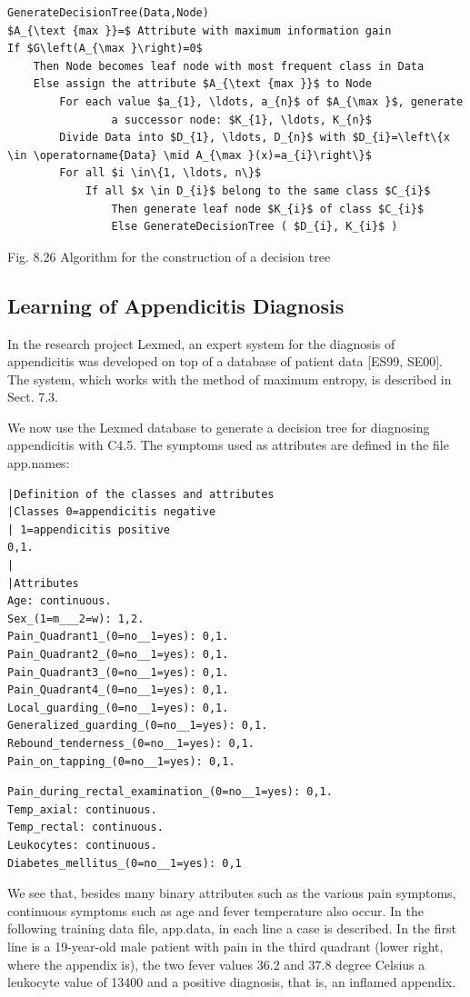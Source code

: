 \documentclass[10pt]{book}
\begin{document}
\begin{verbatim}
GenerateDecisionTree(Data,Node)
$A_{\text {max }}=$ Attribute with maximum information gain
If $G\left(A_{\max }\right)=0$
    Then Node becomes leaf node with most frequent class in Data
    Else assign the attribute $A_{\text {max }}$ to Node
        For each value $a_{1}, \ldots, a_{n}$ of $A_{\max }$, generate
                a successor node: $K_{1}, \ldots, K_{n}$
        Divide Data into $D_{1}, \ldots, D_{n}$ with $D_{i}=\left\{x \in \operatorname{Data} \mid A_{\max }(x)=a_{i}\right\}$
        For all $i \in\{1, \ldots, n\}$
            If all $x \in D_{i}$ belong to the same class $C_{i}$
                Then generate leaf node $K_{i}$ of class $C_{i}$
                Else GenerateDecisionTree ( $D_{i}, K_{i}$ )
\end{verbatim}

Fig. 8.26 Algorithm for the construction of a decision tree

\subsection{Learning of Appendicitis Diagnosis}
In the research project Lexmed, an expert system for the diagnosis of appendicitis was developed on top of a database of patient data [ES99, SE00]. The system, which works with the method of maximum entropy, is described in Sect. 7.3.

We now use the Lexmed database to generate a decision tree for diagnosing appendicitis with C4.5. The symptoms used as attributes are defined in the file app.names:

\begin{verbatim}
|Definition of the classes and attributes
|Classes 0=appendicitis negative
| 1=appendicitis positive
0,1.
|
|Attributes
Age: continuous.
Sex_(1=m___2=w): 1,2.
Pain_Quadrant1_(0=no__1=yes): 0,1.
Pain_Quadrant2_(0=no__1=yes): 0,1.
Pain_Quadrant3_(0=no__1=yes): 0,1.
Pain_Quadrant4_(0=no__1=yes): 0,1.
Local_guarding_(0=no__1=yes): 0,1.
Generalized_guarding_(0=no__1=yes): 0,1.
Rebound_tenderness_(0=no__1=yes): 0,1.
Pain_on_tapping_(0=no__1=yes): 0,1.
\end{verbatim}

\begin{verbatim}
Pain_during_rectal_examination_(0=no__1=yes): 0,1.
Temp_axial: continuous.
Temp_rectal: continuous.
Leukocytes: continuous.
Diabetes_mellitus_(0=no__1=yes): 0,1
\end{verbatim}

We see that, besides many binary attributes such as the various pain symptoms, continuous symptoms such as age and fever temperature also occur. In the following training data file, app.data, in each line a case is described. In the first line is a 19-year-old male patient with pain in the third quadrant (lower right, where the appendix is), the two fever values 36.2 and 37.8 degree Celsius a leukocyte value of 13400 and a positive diagnosis, that is, an inflamed appendix.
\end{document}

